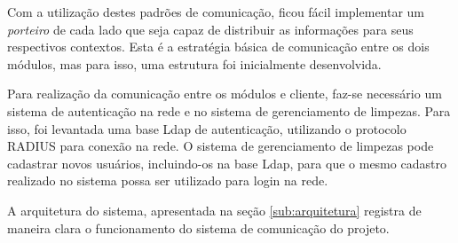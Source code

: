 		Com a utilização destes padrões de comunicação, ficou fácil implementar um \textit{porteiro} de cada lado que seja capaz de distribuir as informações para seus respectivos contextos. Esta é a estratégia básica de comunicação entre os dois módulos, mas para isso, uma estrutura foi inicialmente desenvolvida.

		Para realização da comunicação entre os módulos e cliente, faz-se necessário um sistema de autenticação na rede e no sistema de gerenciamento de limpezas. Para isso, foi levantada uma base Ldap de autenticação, utilizando o protocolo RADIUS para conexão na rede. O sistema de gerenciamento de limpezas pode cadastrar novos usuários, incluindo-os na base Ldap, para que o mesmo cadastro realizado no sistema possa ser utilizado para login na rede.

		A arquitetura do sistema, apresentada na seção \ref{sub:arquitetura} registra de maneira clara o funcionamento do sistema de comunicação do projeto. 

